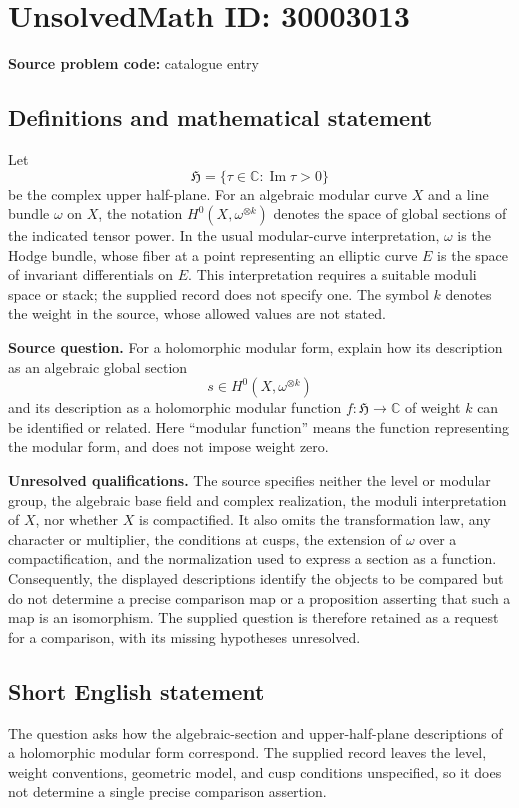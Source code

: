 \documentclass[11pt]{article}
\newcommand{\C}{\mathbb{C}}
\begin{document}
\section*{UnsolvedMath ID: 30003013}
\textbf{Source problem code:} catalogue entry
\subsection{Definitions and mathematical statement}
Let
\[
\mathfrak H=\{\tau\in\C:\operatorname{Im}\tau>0\}
\]
be the complex upper half-plane. For an algebraic modular curve \(X\) and a line bundle \(\omega\) on \(X\), the notation \(H^0(X,\omega^{\otimes k})\) denotes the space of global sections of the indicated tensor power. In the usual modular-curve interpretation, \(\omega\) is the Hodge bundle, whose fiber at a point representing an elliptic curve \(E\) is the space of invariant differentials on \(E\). This interpretation requires a suitable moduli space or stack; the supplied record does not specify one. The symbol \(k\) denotes the weight in the source, whose allowed values are not stated.

\textbf{Source question.} For a holomorphic modular form, explain how its description as an algebraic global section
\[
s\in H^0(X,\omega^{\otimes k})
\]
and its description as a holomorphic modular function \(f:\mathfrak H\to\C\) of weight \(k\) can be identified or related. Here ``modular function'' means the function representing the modular form, and does not impose weight zero.

\textbf{Unresolved qualifications.} The source specifies neither the level or modular group, the algebraic base field and complex realization, the moduli interpretation of \(X\), nor whether \(X\) is compactified. It also omits the transformation law, any character or multiplier, the conditions at cusps, the extension of \(\omega\) over a compactification, and the normalization used to express a section as a function. Consequently, the displayed descriptions identify the objects to be compared but do not determine a precise comparison map or a proposition asserting that such a map is an isomorphism. The supplied question is therefore retained as a request for a comparison, with its missing hypotheses unresolved.
\subsection{Short English statement}
The question asks how the algebraic-section and upper-half-plane descriptions of a holomorphic modular form correspond. The supplied record leaves the level, weight conventions, geometric model, and cusp conditions unspecified, so it does not determine a single precise comparison assertion.
\end{document}
